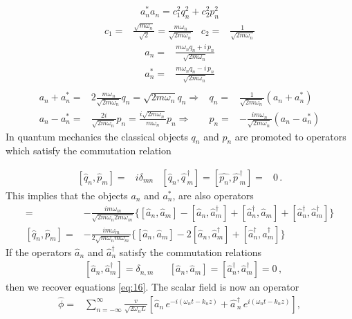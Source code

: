 \begin{frame}
\begin{align}
  a_n^*a_n=c_1^2 q_n^2+c_2^2 p_n^2
\end{align}
\begin{align}
c_1=&\frac{\sqrt{m\omega_n}}{\sqrt{2}}=\frac{m\omega_n}{\sqrt{2m\omega_n}}   & c_2=&\frac{1}{\sqrt{2m\omega_n}}
\end{align}
\begin{align}
  a_n=&\frac{m\omega_n q_n+i\,p_n}{\sqrt{2m\omega_n}}\nonumber\\
  a_n^*=&\frac{m\omega_n q_n-i\,p_n}{\sqrt{2m\omega_n}}\nonumber\\
\end{align}
\begin{align}
a_n+a_n^*=& 2\frac{m\omega_n}{\sqrt{2m\omega_n}}q_n=\sqrt{2m\omega_n}q_n \Rightarrow& q_n=&\frac{1}{\sqrt{2m\omega_n}}(a_n+a_n^*) \nonumber\\
a_n-a_n^*=&\frac{2i}{\sqrt{2m\omega_n}}p_n=\frac{i\sqrt{2m\omega_n}}{m\omega_n}p_n
\Rightarrow& p_n=&-\frac{im\omega_n}{\sqrt{2m\omega_n}}(a_n-a_n^*) 
\end{align}
In quantum mechanics the classical objects $q_n$ and $p_n$ are promoted to operators which satisfy the commutation relation

\begin{align}
\label{eq:16}
  [\widehat{q}_n,\widehat{p}_m]=&i\delta_{m n} &
  [\widehat{q}_n,\widehat{q\,}_m^\dagger]= [\widehat{p_n},\widehat{p\,}_m^\dagger]=&0\,. 
\end{align}
This implies that the objects $a_n$ and $a_n^*$, are also operators
\begin{align}
  [\widehat{q}_n,\widehat{p}_m]=&-\frac{i m\omega_m}{\sqrt{2m\omega_n 2m\omega_m}}\{ 
[\widehat{a}_{n},\widehat{a}_{m}]-[\widehat{a}_{n},\widehat{a}_{m}^\dagger]
+[\widehat{a}_{n}^\dagger,\widehat{a}_{m}]+[\widehat{a}_{n}^\dagger,\widehat{a}_{m}^\dagger]
\} \nonumber\\
  [\widehat{q}_n,\widehat{p}_m]=&-\frac{i m\omega_m}{2\sqrt{m\omega_n m\omega_m}}\{ 
[\widehat{a}_{n},\widehat{a}_{m}]-2[\widehat{a}_{n},\widehat{a}_{m}^\dagger]
+[\widehat{a}_{n}^\dagger,\widehat{a}_{m}^\dagger]
\} 
\end{align}
If the operators $\widehat{a}_{n}$ and $\widehat{a}_{n}^\dagger$ satisfy the commutation relations
\begin{align}
\label{eq:17}
  &\left[\widehat{a}_{n},\widehat{a}_{m}^\dagger\right]=
\delta_{{n},{m}}&
&\left[\widehat{a}_{n},\widehat{a}_{m}\right]=
\left[\widehat{a}_{n}^\dagger,\widehat{a}_{m}^\dagger\right]=0\,,
\end{align}
then we recover equations \eqref{eq:16}. The scalar field is now an operator
\begin{align}
\label{eq:18}
  \widehat{\phi}=&\sum_{n=-\infty}^\infty\frac{v}{\sqrt{2\omega_nL}}
  \left[\widehat{a}_n\,e^{-i(\omega_n t-k_n z)}+\widehat{a\,}_n^\dagger\,e^{i(\omega_n t-k_n z)}\right],
\end{align}



\end{frame}
